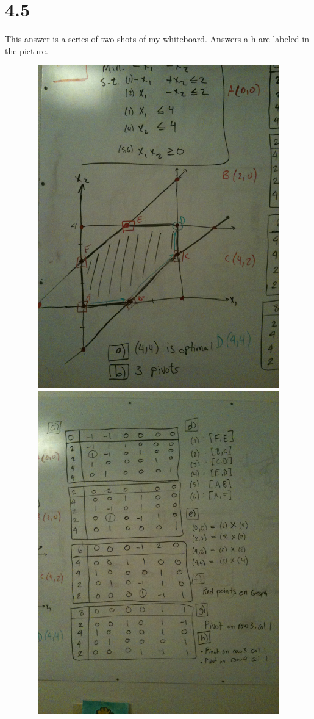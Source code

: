 \documentclass[a4paper,12pt]{article}
\begin{document}
\section*{4.5}
This answer is a series of two shots of my whiteboard. Answers a-h are labeled in the picture.\\
\begin{center}
  \includegraphics[width=14cm, height=14cm, keepaspectratio=true, angle=-90]{image/4_5_shot1.jpg}\\
  \includegraphics[width=14cm, height=14cm, keepaspectratio=true, angle=-90]{image/4_5_shot2.jpg}
\end{center}
\end{document}
